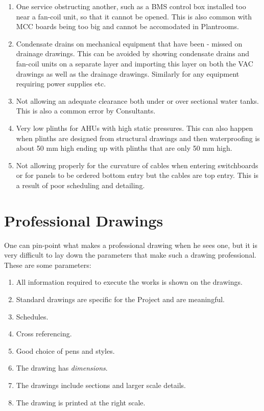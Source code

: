 \begin{enumerate}
\item One service obstructing another, such as a BMS control box installed too near a fan-coil unit, so that it cannot be opened. This is also common with MCC
boards being too big and cannot be accomodated in Plantrooms.

\item Condensate drains on mechanical equipment that have been - missed on drainage drawings. This can be avoided by showing condensate drains and fan-coil
units on a separate layer and importing this layer on both the VAC drawings
as well as the drainage drawings. Similarly for any equipment requiring power supplies etc.

\item Not allowing an adequate clearance both under or over sectional water tanks.
This is also a common error by Consultants.

\item Very low plinths for AHUs with high static pressures. This can also happen
when plinths are designed from structural drawings and then waterproofing is about
50 mm high ending up with plinths that are only 50 mm high. 

\item Not allowing properly for the curvature of cables when entering switchboards
or for panels to be ordered bottom entry but the cables are top entry. This is a 
result of poor scheduling and detailing.

\end{enumerate}



\section*{Professional Drawings}

One can pin-point what makes a professional drawing when he sees one, but it is 
very difficult to lay down the parameters that make such a drawing professional.
These are some parameters:

\begin{enumerate}
\item All information required to execute the works is shown on the drawings.
\item Standard drawings are specific for the Project and are meaningful.
\item Schedules.
\item Cross referencing.
\item Good choice of pens and styles.
\item The drawing has \textit{dimensions}. 
\item The drawings include sections and larger scale details.
\item The drawing is printed at the right scale.
\end{enumerate}














